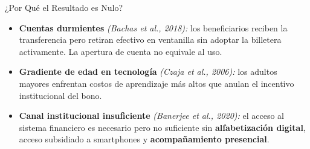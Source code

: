 \documentclass[aspectratio=169, 10pt]{beamer}
\begin{document}
\begin{frame}{¿Por Qué el Resultado es Nulo?}
  \begin{itemize}
    \setlength\itemsep{14pt}
    \item \textbf{Cuentas durmientes}
          \textit{(Bachas et al., 2018):}
          los beneficiarios reciben la transferencia pero retiran efectivo
          en ventanilla sin adoptar la billetera activamente.
          La apertura de cuenta no equivale al uso.

    \item \textbf{Gradiente de edad en tecnología}
          \textit{(Czaja et al., 2006):}
          los adultos mayores enfrentan costos de aprendizaje
          más altos que anulan el incentivo institucional del bono.

    \item \textbf{Canal institucional insuficiente}
          \textit{(Banerjee et al., 2020):}
          el acceso al sistema financiero es necesario pero
          no suficiente sin \textbf{alfabetización digital},
          acceso subsidiado a smartphones y
          \textbf{acompañamiento presencial}.
  \end{itemize}
\end{frame}
\end{document}
